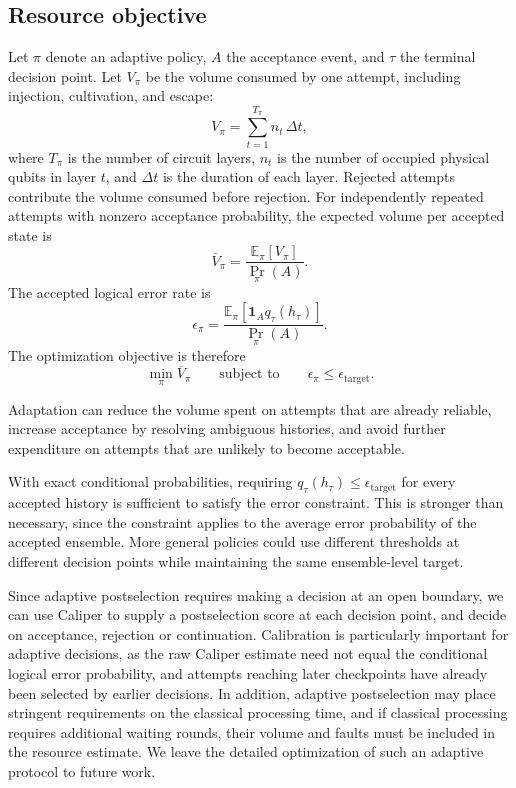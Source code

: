 \documentclass[
    reprint,
    amsmath,amssymb,
    nofootinbib,
    superscriptaddress,
    aps,
    noeprint,
    longbibliography,
    prl
]{revtex4-2}
\theoremstyle{plain}
\begin{document}
\subsection{Resource objective}

Let $\pi$ denote an adaptive policy, $A$ the acceptance event, and $\tau$ the terminal decision point. Let $V_\pi$ be the volume consumed by one attempt, including injection, cultivation, and escape:
\begin{equation}
    V_\pi = \sum_{t=1}^{T_\pi} n_t\,\Delta t,
\end{equation}
where $T_\pi$ is the number of circuit layers, $n_t$ is the number of occupied physical qubits in layer $t$, and $\Delta t$ is the duration of each layer. Rejected attempts contribute the volume consumed before rejection. For independently repeated attempts with nonzero acceptance probability, the expected volume per accepted state is
\begin{equation}
    \overline V_\pi
    =
    \frac{\mathbb E_\pi[V_\pi]}{\Pr_\pi(A)}.
\end{equation}
The accepted logical error rate is
\begin{equation}
    \epsilon_\pi
    =
    \frac{
        \mathbb E_\pi\!\left[
            \mathbf 1_A q_\tau(h_\tau)
        \right]
    }{
        \Pr_\pi(A)
    }.
\end{equation}
The optimization objective is therefore
\begin{equation}
    \min_\pi \overline V_\pi
    \qquad \text{subject to} \qquad
    \epsilon_\pi \leq \epsilon_{\mathrm{target}}.
\end{equation}

Adaptation can reduce the volume spent on attempts that are already reliable, increase acceptance by resolving ambiguous histories, and avoid further expenditure on attempts that are unlikely to become acceptable.

With exact conditional probabilities, requiring
$q_\tau(h_\tau)\leq\epsilon_{\mathrm{target}}$ for every accepted history is sufficient to satisfy the error constraint. This is stronger than necessary, since the constraint applies to the average error probability of the accepted ensemble. More general policies could use different thresholds at different decision points while maintaining the same ensemble-level target.

Since adaptive postselection requires making a decision at an open boundary, we can use Caliper to supply a postselection score at each decision point, and decide on acceptance, rejection or continuation. Calibration is particularly important for adaptive decisions, as the raw Caliper estimate need not equal the conditional logical error probability, and attempts reaching later checkpoints have already been selected by earlier decisions. In addition, adaptive postselection may place stringent requirements on the classical processing time, and if classical processing requires additional waiting rounds, their volume and faults must be included in the resource estimate. We leave the detailed optimization of such an adaptive protocol to future work.
\end{document}
